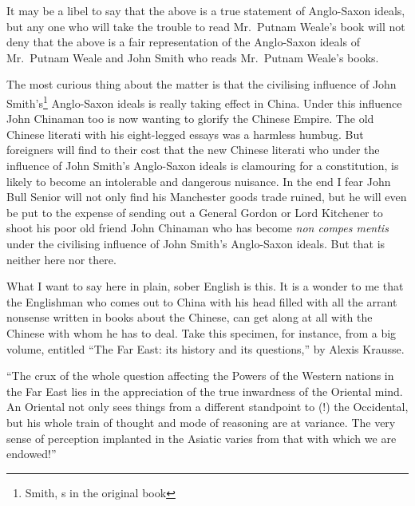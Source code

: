 It may be a libel to say that the above is a true statement of Anglo-Saxon ideals, but any one who will take the trouble to read Mr.~Putnam Weale's book will not deny that the above is a fair representation of the Anglo-Saxon ideals of Mr.~Putnam Weale and John Smith who reads Mr.~Putnam Weale's books.

The most curious thing about the matter is that the civilising influence of John Smith's\footnote{Smith, s in the original book} Anglo-Saxon ideals is really taking effect in China.
Under this influence John Chinaman too is now wanting to glorify the Chinese Empire.
The old Chinese literati with his eight-legged essays was a harmless humbug.
But foreigners will find to their cost that the new Chinese literati who under the influence of John Smith's Anglo-Saxon ideals is clamouring for a constitution, is likely to become an intolerable and dangerous nuisance.
In the end I fear John Bull Senior will not only find his Manchester goods trade ruined, but he will even be put to the expense of sending out a General Gordon or Lord Kitchener to shoot his poor old friend John Chinaman who has become \emph{non compes mentis} under the civilising influence of John Smith's Anglo-Saxon ideals.
But that is neither here nor there.

What I want to say here in plain, sober English is this.
It is a wonder to me that the Englishman who comes out to China with his head filled with all the arrant nonsense written in books about the Chinese, can get along at all with the Chinese with whom he has to deal.
Take this specimen, for instance, from a big volume, entitled ``The Far East: its history and its questions,'' by Alexis Krausse.

``The crux of the whole question affecting the Powers of the Western nations in the Far East lies in the appreciation of the true inwardness of the Oriental mind.
An Oriental not only sees things from a different standpoint to (!) the Occidental, but his whole train of thought and mode of reasoning are at variance.
The very sense of perception implanted in the Asiatic varies from that with which we are endowed!''

